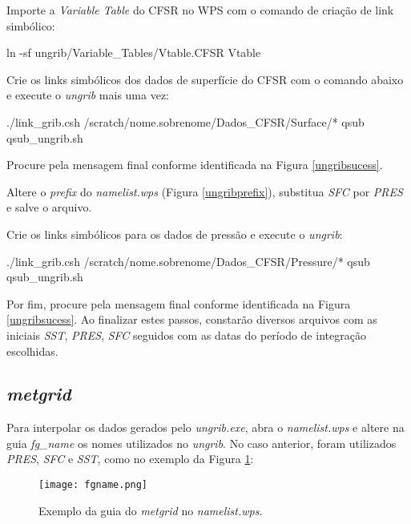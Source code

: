 \noindent Importe a \textit{Variable Table} do CFSR no WPS com o comando de criação de link simbólico:
\bigskip

\begin{bashcode}
ln -sf ungrib/Variable_Tables/Vtable.CFSR Vtable
\end{bashcode}
\bigskip

\noindent Crie os links simbólicos dos dados de superfície do CFSR com o comando abaixo e execute o \textit{ungrib} mais uma vez:
\bigskip

\begin{bashcode}
./link_grib.csh /scratch/nome.sobrenome/Dados_CFSR/Surface/*
qsub qsub_ungrib.sh
\end{bashcode}
\bigskip

\noindent Procure pela mensagem final conforme identificada na Figura \textcolor{bleu_cite}{\ref{ungribsucess}}.
\bigskip

\noindent Altere o \textit{prefix} do \textit{namelist.wps} (Figura \textcolor{bleu_cite}{\ref{ungribprefix}}), substitua \textit{SFC} por \textit{PRES} e salve o arquivo.
\bigskip

\noindent Crie os links simbólicos para os dados de pressão e execute o \textit{ungrib}:
\bigskip

\begin{bashcode}
./link_grib.csh /scratch/nome.sobrenome/Dados_CFSR/Pressure/*
qsub qsub_ungrib.sh
\end{bashcode}
\bigskip

\noindent Por fim, procure pela mensagem final conforme identificada na Figura \textcolor{bleu_cite}{\ref{ungribsucess}}. Ao finalizar estes passos, constarão diversos arquivos com as iniciais \textit{SST}, \textit{PRES}, \textit{SFC} seguidos com as datas do período de integração escolhidas.
\bigskip




\subsection{\textit{metgrid}}\label{metgridsecao}
\bigskip
\noindent Para interpolar os dados gerados pelo \textit{ungrib.exe},  abra o \textit{namelist.wps} e altere na guia \textit{fg\_name} os nomes utilizados no \textit{ungrib}. No caso anterior, foram utilizados \textit{PRES}, \textit{SFC} e \textit{SST}, como no exemplo da Figura \textcolor{bleu_cite}{\ref{fgname}}:
\bigskip

\begin{figure}[H]
    \centering
    \texttt{[image: fgname.png]}
    \caption{Exemplo da guia do \textit{metgrid} no \textit{namelist.wps}.}
    \label{fgname}
\end{figure}
\bigskip

